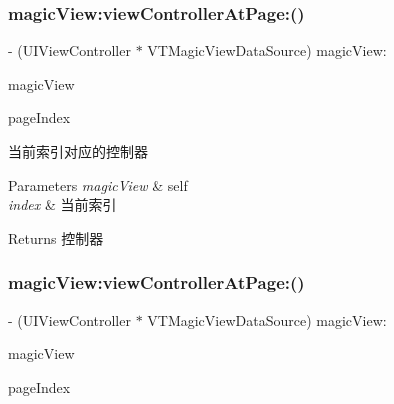 \subsubsection{\texorpdfstring{magic\+View\+:view\+Controller\+At\+Page\+:()}{magicView:viewControllerAtPage:()}\hspace{0.1cm}{\footnotesize\ttfamily [1/3]}}
{\footnotesize\ttfamily -\/ (U\+I\+View\+Controller $\ast$ V\+T\+Magic\+View\+Data\+Source) magic\+View\+: \begin{DoxyParamCaption}\item[{(\mbox{\hyperlink{interface_v_t_magic_view}{V\+T\+Magic\+View}} $\ast$)}]{magic\+View }\item[{viewControllerAtPage:(N\+S\+U\+Integer)}]{page\+Index }\end{DoxyParamCaption}}

当前索引对应的控制器


\begin{DoxyParams}{Parameters}
{\em magic\+View} & self \\
\hline
{\em index} & 当前索引\\
\hline
\end{DoxyParams}
\begin{DoxyReturn}{Returns}
控制器 
\end{DoxyReturn}
\mbox{\label{protocol_v_t_magic_view_data_source_01-p_a87d024c23dfc7b73dbc606127337d138}} 
\subsubsection{\texorpdfstring{magic\+View\+:view\+Controller\+At\+Page\+:()}{magicView:viewControllerAtPage:()}\hspace{0.1cm}{\footnotesize\ttfamily [2/3]}}
{\footnotesize\ttfamily -\/ (U\+I\+View\+Controller $\ast$ V\+T\+Magic\+View\+Data\+Source) magic\+View\+: \begin{DoxyParamCaption}\item[{(\mbox{\hyperlink{interface_v_t_magic_view}{V\+T\+Magic\+View}} $\ast$)}]{magic\+View }\item[{viewControllerAtPage:(N\+S\+U\+Integer)}]{page\+Index }\end{DoxyParamCaption}}

